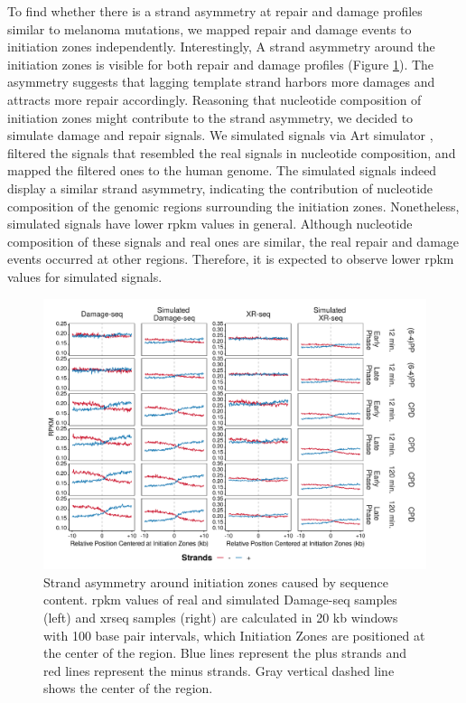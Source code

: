 To find whether there is a strand asymmetry at repair and damage profiles similar to melanoma mutations, we mapped repair and damage events to initiation zones independently. Interestingly, A strand asymmetry around the initiation zones is visible for both repair and damage profiles (Figure \ref{fig:simulation}). The asymmetry suggests that lagging template strand harbors more damages and attracts more repair accordingly. Reasoning that nucleotide composition of initiation zones might contribute to the strand asymmetry, we decided to simulate damage and repair signals. We simulated signals via Art simulator \citep{huang2012art}, filtered the signals that resembled the real signals in nucleotide composition, and mapped the filtered ones to the human genome. The simulated signals indeed display a similar strand asymmetry, indicating the contribution of nucleotide composition of the genomic regions surrounding the initiation zones. Nonetheless, simulated signals have lower \gls{rpkm} values in general. Although nucleotide composition of these signals and real ones are similar, the real repair and damage events occurred at other regions. Therefore, it is expected to observe lower \gls{rpkm} values for simulated signals. 

\begin{figure}[H]
    \begin{center}
    \includegraphics[width=\textwidth]{Chapters/4_results/figures/fig5}
    \caption[Strand asymmetry around initiation zones caused by sequence content.]{Strand asymmetry around initiation zones caused by sequence content. \gls{rpkm} values of real and simulated Damage-seq samples (left) and \gls{xrseq} samples (right) are calculated in 20 kb windows with 100 base pair intervals, which Initiation Zones are positioned at the center of the region. Blue lines represent the plus strands and red lines represent the minus strands. Gray vertical dashed line shows the center of the region.}
    \label{fig:simulation}
    \end{center}
    \end{figure}

